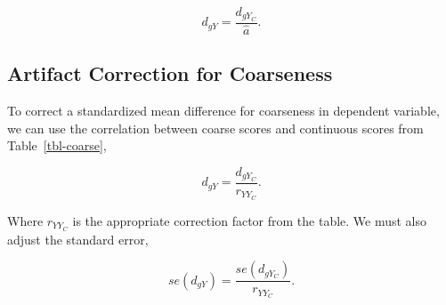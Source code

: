 \documentclass[
  letterpaper,
  DIV=11,
  numbers=noendperiod]{scrreprt}
\begin{document}
\[
d_{gY} = \frac{d_{gY_C}}{\hat{a}}.
\]

\hypertarget{artifact-correction-for-coarseness}{%
\subsection{Artifact Correction for
Coarseness}\label{artifact-correction-for-coarseness}}

To correct a standardized mean difference for coarseness in dependent
variable, we can use the correlation between coarse scores and
continuous scores from Table~\ref{tbl-coarse},

\[
d_{gY} = \frac{d_{gY_C}}{r_{YY_C}}.
\]

Where \(r_{YY_C}\) is the appropriate correction factor from the table.
We must also adjust the standard error,

\[
se(d_{gY}) = \frac{se(d_{gY_C})}{r_{YY_C}}.
\]
\end{document}
